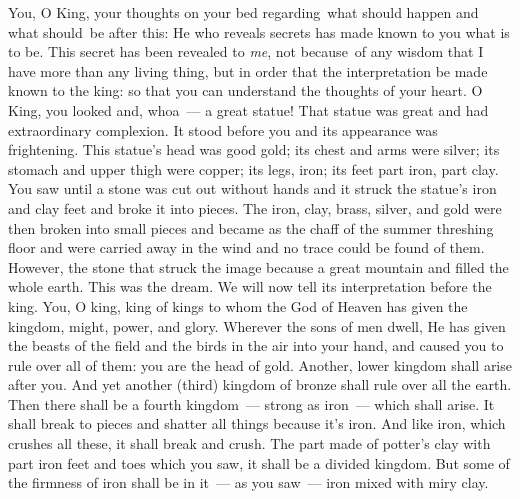 \begin{inparaenum}
     You, O King, your thoughts on your bed regarding\understood\ what should happen and what should\understood\ be after this: He who reveals secrets has made known to you what is to be.%
     This secret has been revealed to \emph{me}, not because\understood\ of any wisdom that I have more than any living thing, but in order that the interpretation be made known to the king: so that you can understand the thoughts of your heart.%
     O King, you looked and, whoa~--- a great statue! That statue was great and had extraordinary complexion. It stood before you and its appearance was frightening.%
     This statue's head was good gold; its chest and arms were silver; its stomach and upper thigh were copper;%
     its legs, iron; its feet part iron, part clay.%
     You saw until a stone was cut out without hands and it struck the statue's iron and clay feet and broke it into pieces.%
     The iron, clay, brass, silver, and gold were then broken into small pieces and became as the chaff of the summer threshing floor and were carried away in the wind and no trace could be found of them. However, the stone that struck the image because a great mountain and filled the whole earth.%
     This was the dream. We will now tell its interpretation before the king.%
     You, O king, king of kings to whom the God of Heaven has given the kingdom, might, power, and glory.%
     Wherever the sons of men dwell, He has given the beasts of the field and the birds in the air into your hand, and caused you to rule over all of them: you are the head of gold.%
     Another, lower kingdom shall arise after you. And yet another (third) kingdom of bronze shall rule over all the earth.%
     Then there shall be a fourth kingdom~--- strong as iron~--- which shall arise. It shall break to pieces and shatter all things because it's iron. And like iron, which crushes all these, it shall break and crush.%
     The part made of potter's clay with part iron feet and toes which you saw, it shall be a divided kingdom. But some of the firmness of iron shall be in it~--- as you saw~--- iron mixed with miry clay.%

\end{inparaenum}
